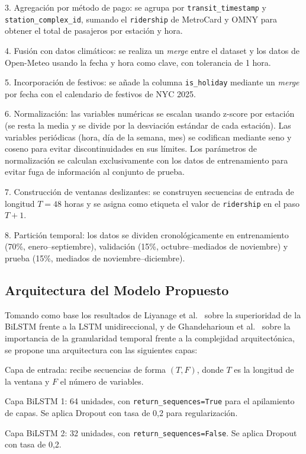 \documentclass[preprint,12pt]{elsarticle}
\begin{document}
3. Agregación por método de pago: se agrupa por \texttt{transit\_timestamp} y \texttt{station\_complex\_id}, sumando el \texttt{ridership} de MetroCard y OMNY para obtener el total de pasajeros por estación y hora.

4. Fusión con datos climáticos: se realiza un \textit{merge} entre el dataset y los datos de Open-Meteo usando la fecha y hora como clave, con tolerancia de 1 hora.

5. Incorporación de festivos: se añade la columna \texttt{is\_holiday} mediante un \textit{merge} por fecha con el calendario de festivos de NYC 2025.

6. Normalización: las variables numéricas se escalan usando z-score por estación (se resta la media y se divide por la desviación estándar de cada estación). Las variables periódicas (hora, día de la semana, mes) se codifican mediante seno y coseno para evitar discontinuidades en sus límites. Los parámetros de normalización se calculan exclusivamente con los datos de entrenamiento para evitar fuga de información al conjunto de prueba.

7. Construcción de ventanas deslizantes: se construyen secuencias de entrada de longitud $T = 48$ horas y se asigna como etiqueta el valor de \texttt{ridership} en el paso $T+1$.

8. Partición temporal: los datos se dividen cronológicamente en entrenamiento (70\%, enero--septiembre), validación (15\%, octubre--mediados de noviembre) y prueba (15\%, mediados de noviembre--diciembre).

\subsection{Arquitectura del Modelo Propuesto}

Tomando como base los resultados de Liyanage et al.\ \cite{liyanage2022} sobre la superioridad de la BiLSTM frente a la LSTM unidireccional, y de Ghandeharioun et al.\ \cite{ghandeharioun2023} sobre la importancia de la granularidad temporal frente a la complejidad arquitectónica, se propone una arquitectura con las siguientes capas:

Capa de entrada: recibe secuencias de forma $(T, F)$, donde $T$ es la longitud de la ventana y $F$ el número de variables.

Capa BiLSTM 1: 64 unidades, con \texttt{return\_sequences=True} para el apilamiento de capas. Se aplica Dropout con tasa de 0,2 para regularización.

Capa BiLSTM 2: 32 unidades, con \texttt{return\_sequences=False}. Se aplica Dropout con tasa de 0,2.
\end{document}
